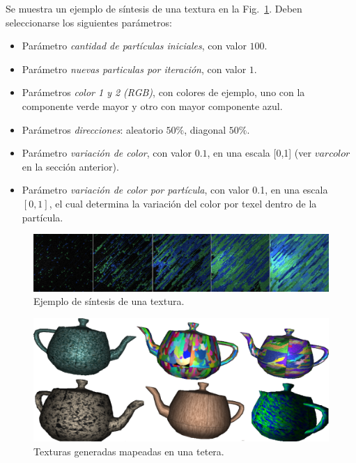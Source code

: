 Se muestra un ejemplo de s\'intesis de una textura en la Fig.~\ref{sintesis}. Deben seleccionarse los siguientes par\'ametros:

\begin{itemize}
\item Par\'ametro {\em cantidad de part\'iculas iniciales}, con valor $100$.
\item Par\'ametro {\em nuevas particulas por iteraci\'on}, con valor $1$.
\item Par\'ametros {\em color 1 y 2 (RGB)}, con colores de ejemplo, uno con la componente verde mayor y otro con mayor componente azul.
\item Par\'ametros {\em direcciones}: aleatorio $50\%$, diagonal $50\%$.
\item Par\'ametro {\em variaci\'on de color}, con valor $0.1$, en una escala [0,1] (ver $varcolor$ en la secci\'on anterior).
\item Par\'ametro {\em variaci\'on de color por part\'icula}, con valor 0.1, en una escala $[0,1]$, el cual determina la variaci\'on del color por texel dentro de la part\'icula.
\end{itemize}

\begin{figure}[t!]
\centering
\includegraphics[scale=0.12]{figures/sintesis}
\caption{Ejemplo de s\'intesis de una textura.}
\label{sintesis}
\end{figure}

\begin{figure}[t!]
\centering
\includegraphics[scale=0.14]{figures/teteras}
\caption{Texturas generadas mapeadas en una tetera.}
\label{teteras}
\end{figure}


